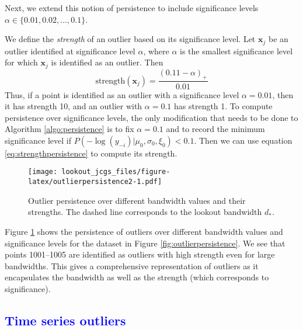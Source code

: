 \documentclass[12pt]{article}
\theoremstyle{definition}
\theoremstyle{definition}
\theoremstyle{definition}
\theoremstyle{definition}
\theoremstyle{remark}
\begin{document}
Next, we extend this notion of persistence to include significance levels \(\alpha \in \{0.01, 0.02, \dots, 0.1 \}\).

We define the \emph{strength} of an outlier based on its significance level. Let \(\bm{x}_j\) be an outlier identified at significance level \(\alpha\), where \(\alpha\) is the smallest significance level for which \(\bm{x}_j\) is identified as an outlier. Then
\begin{equation}\label{eq:strengthpersistence}
    \text{strength} (\bm{x}_j) = \frac{(0.11 - \alpha)_+}{0.01}
\end{equation}
Thus, if a point is identified as an outlier with a significance level \(\alpha = 0.01\), then it has strength 10, and an outlier with \(\alpha = 0.1\) has strength 1. To compute persistence over significance levels, the only modification that needs to be done to Algorithm \ref{algo:persistence} is to fix \(\alpha = 0.1\) and to record the minimum significance level if \(P\left(-\log(y_{-i})|\mu_0, \sigma_0, \xi_0 \right) < 0.1\).
Then we can use equation \eqref{eq:strengthpersistence} to compute its strength.

\begin{figure}
\centering
\texttt{[image: lookout\_jcgs\_files/figure-latex/outlierpersistence2-1.pdf]}
\caption{\label{fig:outlierpersistence2}Outlier persistence over different bandwidth values and their strengths. The dashed line corresponds to the lookout bandwidth \(d_*\).}
\end{figure}

Figure \ref{fig:outlierpersistence2} shows the persistence of outliers over different bandwidth values and significance levels for the dataset in Figure \ref{fig:outlierpersistence}. We see that points 1001--1005 are identified as outliers with high strength even for large bandwidths. This gives a comprehensive representation of outliers as it encapsulates the bandwidth as well as the strength (which corresponds to significance).

\hypertarget{sec:timeseriesoutiers}{%
\subsection{\texorpdfstring{\textcolor{blue}{Time series outliers}}{}}\label{sec:timeseriesoutiers}}
\end{document}
